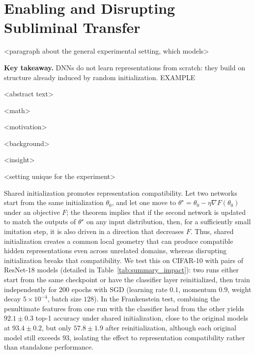 \section{Enabling and Disrupting Subliminal Transfer}

<paragraph about the general experimental setting, which models>

\begin{tcolorbox}[
  colback=gray!5,
  colframe=black!70,
  boxrule=0.6pt,
  arc=2pt,
  title=\textbf{Information Learning}
]
\textbf{Key takeaway.} DNNs do not learn representations from scratch: they build on structure already induced by random initialization. EXAMPLE
\end{tcolorbox}

<abstract text>

<math>

<motivation>

<background>

<insight>

<setting unique for the experiment>

Shared initialization promotes representation compatibility. Let two networks start from the same initialization $\theta_0$, and let one move to $\theta^\star=\theta_0-\eta \nabla F(\theta_0)$ under an objective $F$; the theorem implies that if the second network is updated to match the outputs of $\theta^\star$ on any input distribution, then, for a sufficiently small imitation step, it is also driven in a direction that decreases $F$. Thus, shared initialization creates a common local geometry that can produce compatible hidden representations even across unrelated domains, whereas disrupting initialization breaks that compatibility. We test this on CIFAR-10 with pairs of ResNet-18 models (detailed in Table~\ref{tab:summary_impact}): two runs either start from the same checkpoint or have the classifier layer reinitialized, then train independently for 200 epochs with SGD (learning rate $0.1$, momentum $0.9$, weight decay $5\times10^{-4}$, batch size $128$). In the Frankenstein test, combining the penultimate features from one run with the classifier head from the other yields $92.1\pm0.3$ top-1 accuracy under shared initialization, close to the original models at $93.4\pm0.2$, but only $57.8\pm1.9$ after reinitialization, although each original model still exceeds $93$, isolating the effect to representation compatibility rather than standalone performance.

